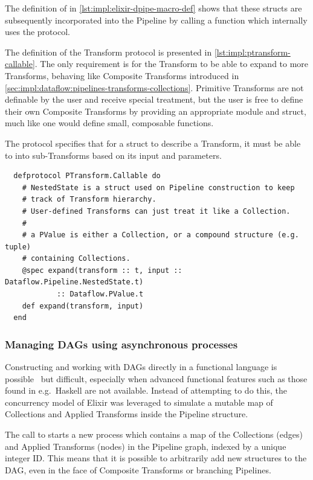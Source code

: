 The definition of \exs{~>} in \cref{lst:impl:elixir-dpipe-macro-def} shows that these structs are subsequently incorporated into the Pipeline by calling a function which internally uses the protocol.

The definition of the Transform protocol is presented in \cref{lst:impl:ptransform-callable}.
The only requirement is for the Transform to be able to expand to more Transforms, behaving like Composite Transforms introduced in \cref{sec:impl:dataflow:pipelines-transforms-collections}.
Primitive Transforms are not definable by the user and receive special treatment, but the user is free to define their own Composite Transforms by providing an appropriate module and struct, much like one would define small, composable functions.

\begin{codelisting}
	\caption[The definition of the  protocol.]{The  protocol specifies that for a struct to describe a Transform, it must be able to  into sub-Transforms based on its input and parameters.}
	\label{lst:impl:ptransform-callable}
	\begin{verbatim}
  defprotocol PTransform.Callable do
    # NestedState is a struct used on Pipeline construction to keep
    # track of Transform hierarchy.
    # User-defined Transforms can just treat it like a Collection.
    # 
    # a PValue is either a Collection, or a compound structure (e.g. tuple)
    # containing Collections.
    @spec expand(transform :: t, input :: Dataflow.Pipeline.NestedState.t)
            :: Dataflow.PValue.t
    def expand(transform, input)
  end
	\end{verbatim}
	
\end{codelisting}


\subsubsection{Managing DAGs using asynchronous processes}

Constructing and working with DAGs directly in a functional language is possible~\cite{Gibbons1995} but difficult, especially when advanced functional features such as those found in e.g.\ Haskell are not available.
Instead of attempting to do this, the concurrency model of Elixir was leveraged to simulate a mutable map of Collections and Applied Transforms inside the Pipeline structure.

The call to  starts a new process which contains a map of the Collections (edges) and Applied Transforms (nodes) in the Pipeline graph, indexed by a unique integer ID.
This means that it is possible to arbitrarily add new structures to the DAG, even in the face of Composite Transforms or branching Pipelines.

